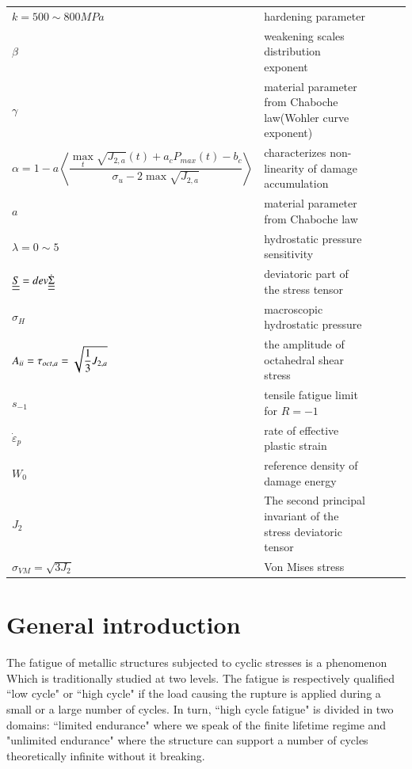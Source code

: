 \documentclass[3p,times,procedia,number]{elsarticle}
\begin{document}
\begin{flushleft}
\begin{table}[h]
\begin{tabular}{lllll}
						$k=500\sim800MPa$ & hardening parameter &  &  &  \\
						$\beta$ & weakening scales distribution exponent  &  &  &  \\
						$\gamma$ & material parameter from Chaboche law(Wohler curve exponent)  &  &  &  \\
						$\alpha=1 - a\left\langle \dfrac{\max\limits_{t}\sqrt{J_{2,a}}(t)+a_c{P_{max}(t)}-b_c}{ \sigma_{u} - 2\max\sqrt{J_{2,a}}}\right\rangle$ & characterizes non-linearity of damage accumulation &  &  &  \\
						$a$ & material parameter from Chaboche law &  &  &  \\
						$\lambda=0\sim5$& hydrostatic pressure sensitivity &  &  &  \\
		             	$\uline{\uline{S}}=dev\dot{\uline{\uline{\Sigma}}}$ & deviatoric part of the stress tensor &  &  &  \\
						$\sigma_H$& macroscopic hydrostatic pressure &  &  &  \\
						$A_{\uppercase\expandafter{\romannumeral2}}=\tau_{oct,a}=\sqrt{\dfrac{1}{3}J_{2,a}}$& the amplitude of octahedral shear stress &  &  &  \\
						$s_{-1}$& tensile fatigue limit for $R=-1$  &  &  &  \\
$ \dot{\varepsilon}_p$ & rate of effective plastic strain &  &  &  \\
$W_0$ & reference density of damage energy &  &  &  \\
$J_2$ & The second principal invariant of the stress deviatoric tensor &  &  &  \\
$\sigma_{VM}=\sqrt{3J_{2}}$& Von Mises stress &  &  &  \\
		\end{tabular}
	\end{table}
\end{flushleft}

\clearpage
\section{General introduction}
The fatigue of metallic structures subjected to cyclic stresses is a phenomenon
Which is traditionally studied at two levels. The fatigue is respectively qualified
``low cycle" or ``high cycle" if the load causing the rupture is applied
during a small or a large number of cycles. In turn, ``high cycle fatigue" is divided
in two domains: ``limited endurance" where we speak of the finite lifetime regime
and "unlimited endurance" where the structure can support a number of cycles theoretically
infinite without it breaking. 
\end{document}
